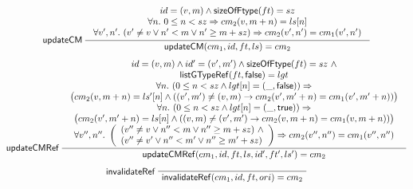 {%
\begin{figure}[htbp]
	\begin{gather*}
		\infer[\updatecm]
		{\updatecm(cm_1, id, ft, ls) = cm_2}
		{
			\begin{array}{c}
				id = (v, m) \wedge \sizeofftype(ft) = sz \\
				\forall n.\ 0 \le n < sz \Rightarrow cm_2(v, m+n) = ls[n] \\
				\forall v', n'.\ (v' \neq v \vee n' < m \vee n' \ge m+sz) \Rightarrow cm_2(v', n') = cm_1(v', n') \\
			\end{array}
		}
		\\[1ex]
		\infer[\updatecmref]
		{\updatecmref(cm_1, id, ft, ls, id', ft', ls') = cm_2}
		{
			\begin{array}{c}
				id = (v, m) \wedge id' = (v', m') \wedge \sizeofftype(ft) = sz\ \wedge \\
				\listgtyperef(ft, \lfalse) = lgt \\
				\forall n.\ (0 \le n < sz \wedge lgt[n] = (\_, \lfalse)) \Rightarrow \\
				\big(
					cm_2(v, m+n) = ls'[n] \wedge ((v',m') \neq (v, m)  \rightarrow cm_2(v', m' + n) = cm_1(v', m'+n)) 
				\big)
				\\ 
				\forall n.\ (0 \le n < sz \wedge lgt[n] = (\_, \ltrue)) \Rightarrow \\
				\big(
					cm_2(v', m'+n) = ls[n] \wedge  
					((v, m) \neq (v', m')  \rightarrow cm_2(v, m + n) = cm_1(v, m+n))
				\big)
				\\
				\forall v'', n''.\ 
				\left(
				\begin{array}{l}
					(v'' \neq v \vee n'' < m \vee n'' \ge m+sz)\ \wedge \\
					(v'' \neq v' \vee n'' < m' \vee n'' \ge m'+sz)
				\end{array}
				\right)
				\Rightarrow cm_2(v'', n'') = cm_1(v'', n'') 
			\end{array}
		}
		\\[1ex]
		\infer[\invalidateref]
		{\invalidateref(cm_1, id, ft, ori) = cm_2}
		{
			\begin{array}{c}

\end{array}}
\end{gather*}
\end{figure}}

